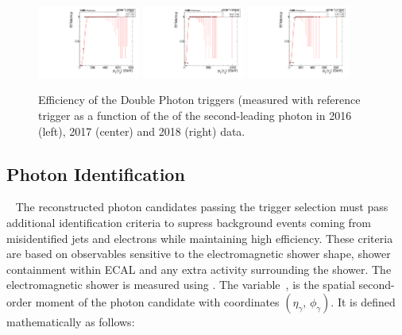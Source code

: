 \begin{figure}[htbp!]
\caption{Efficiency of the Double Photon triggers (measured with reference trigger as a function of the \pt of the second-leading photon in 2016 (left), 2017 (center) and 2018 (right) data.}
\begin{center}
\includegraphics[angle=0,width=0.3\textwidth]{fig/eff_2016_Photon2_pt.pdf}
\includegraphics[angle=0,width=0.3\textwidth]{fig/eff_2017_Photon2_pt.pdf}
\includegraphics[angle=0,width=0.3\textwidth]{fig/eff_2018_Photon2_pt.pdf}
\end{center}
\label{fig:trigger_efficiency}
\end{figure}


\subsection{Photon Identification}~\label{subsec:photonID}
The reconstructed photon candidates passing the trigger selection must pass additional identification criteria to supress background events coming from misidentified jets and electrons while maintaining high efficiency. These criteria are based on observables sensitive to the electromagnetic shower shape, shower containment within ECAL and any extra activity surrounding the shower. The electromagnetic shower is  measured using \sieie. The \sieie variable~\cite{Khachatryan:2015iwa}, is the spatial second-order moment of the photon candidate with coordinates $(\eta_\gamma,\,\phi_\gamma)$. It is defined mathematically as follows:

